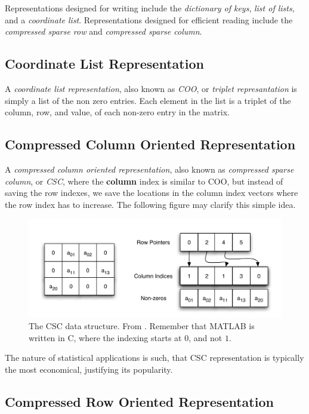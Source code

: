 \documentclass[]{book}
\theoremstyle{definition}
\theoremstyle{definition}
\theoremstyle{definition}
\theoremstyle{remark}
\begin{document}
Representations designed for writing include the \emph{dictionary of
keys}, \emph{list of lists}, and a \emph{coordinate list}.
Representations designed for efficient reading include the
\emph{compressed sparse row} and \emph{compressed sparse column}.

\subsection{Coordinate List Representation}\label{coo}

A \emph{coordinate list representation}, also known as \emph{COO}, or
\emph{triplet represantation} is simply a list of the non zero entries.
Each element in the list is a triplet of the column, row, and value, of
each non-zero entry in the matrix.

\subsection{Compressed Column Oriented
Representation}\label{compressed-column-oriented-representation}

A \emph{compressed column oriented representation}, also known as
\emph{compressed sparse column}, or \emph{CSC}, where the
\textbf{column} index is similar to COO, but instead of saving the row
indexes, we save the locations in the column index vectors where the row
index has to increase. The following figure may clarify this simple
idea.

\begin{figure}
\centering
\includegraphics{art/crc.png}
\caption{The CSC data structure. From \citet{shah2004sparse}. Remember
that MATLAB is written in C, where the indexing starts at \(0\), and not
\(1\).}
\end{figure}

The nature of statistical applications is such, that CSC representation
is typically the most economical, justifying its popularity.

\subsection{Compressed Row Oriented
Representation}\label{compressed-row-oriented-representation}
\end{document}
